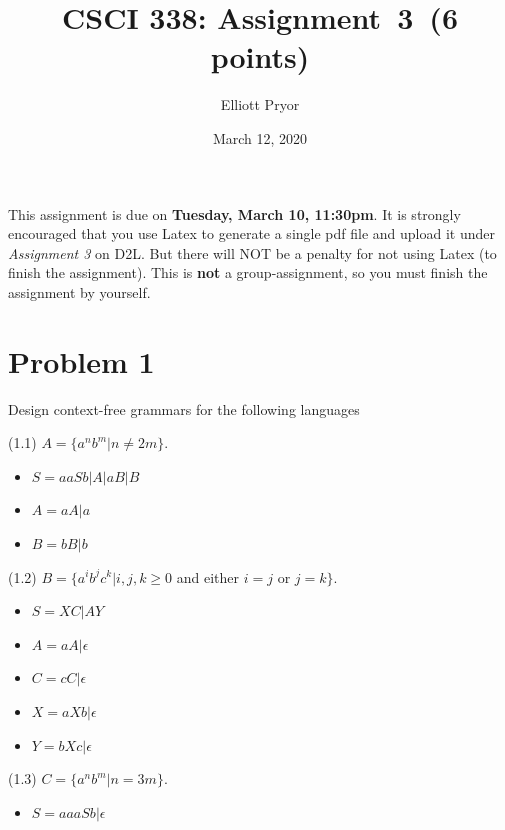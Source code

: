 \documentclass[11pt]{article}
\begin{document}
\date{March 12, 2020}
\title{CSCI 338: Assignment~3~(6 points)}

\author{Elliott Pryor}


\maketitle

\noindent
This assignment is due on {\bf Tuesday, March 10, 11:30pm}. It is strongly
encouraged that you use Latex to generate a single pdf file and upload it
under {\em Assignment 3} on D2L. But there will NOT be a penalty for not
using Latex (to finish the assignment). This is {\bf not} a group-assignment,
so you must finish the assignment by yourself.

\section*{Problem 1}

\noindent
Design context-free grammars for the following languages

(1.1) $A=\{a^nb^m|n\neq 2m\}$.

\begin{itemize}
\item $S = aaSb | A | aB | B$
\item $A = aA | a$
\item $B = bB | b$
\end{itemize}


(1.2) $B=\{a^ib^jc^k|i,j,k\geq 0$ and either $i=j$ or $j=k\}$.

\begin{itemize}
\item $S = XC | AY$
\item $A = aA | \epsilon$
\item $C = cC | \epsilon$
\item $X = aXb | \epsilon$
\item $Y = bXc | \epsilon$

\end{itemize}

(1.3) $C=\{a^nb^m|n=3m\}$.

\begin{itemize}
\item $S = aaaSb | \epsilon$

\end{itemize}
\end{document}
